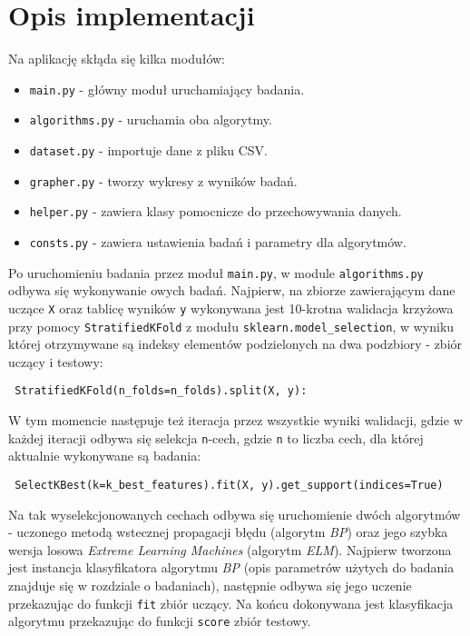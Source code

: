 \newpage

\section{Opis implementacji}

Na aplikację skłąda się kilka modułów:

\begin{itemize}
    \item \texttt{main.py} - główny moduł uruchamiający badania.
    \item \texttt{algorithms.py} - uruchamia oba algorytmy.
    \item \texttt{dataset.py} - importuje dane z pliku CSV.
    \item \texttt{grapher.py} - tworzy wykresy z wyników badań.
    \item \texttt{helper.py} - zawiera klasy pomocnicze do przechowywania danych.
    \item \texttt{consts.py} - zawiera ustawienia badań i parametry dla algorytmów.
\end{itemize}

Po uruchomieniu badania przez moduł \texttt{main.py}, w module \texttt{algorithms.py} odbywa się wykonywanie owych badań. Najpierw, na zbiorze zawierającym dane uczące \texttt{X} oraz tablicę wyników \texttt{y} wykonywana jest 10-krotna walidacja krzyżowa przy pomocy \texttt{StratifiedKFold} z modułu \texttt{sklearn.model\_selection}, w wyniku której otrzymywane są indeksy elementów podzielonych na dwa podzbiory - zbiór uczący i testowy:

\begin{verbatim}
 StratifiedKFold(n_folds=n_folds).split(X, y):
\end{verbatim}

W tym momencie następuje też iteracja przez wszystkie wyniki walidacji, gdzie w każdej iteracji odbywa się selekcja \texttt{n}-cech, gdzie \texttt{n} to liczba cech, dla której aktualnie wykonywane są badania:

\begin{verbatim}
 SelectKBest(k=k_best_features).fit(X, y).get_support(indices=True)
\end{verbatim}

Na tak wyselekcjonowanych cechach odbywa się uruchomienie dwóch algorytmów - uczonego metodą wstecznej propagacji błędu (algorytm \textit{BP}) oraz jego szybka wersja losowa \textit{Extreme Learning Machines} (algorytm \textit{ELM}). Najpierw tworzona jest instancja klasyfikatora algorytmu \textit{BP} (opis parametrów użytych do badania znajduje się w rozdziale o badaniach), następnie odbywa się jego uczenie przekazując do funkcji \texttt{fit} zbiór uczący. Na końcu dokonywana jest klasyfikacja algorytmu przekazując do funkcji \texttt{score} zbiór testowy.

